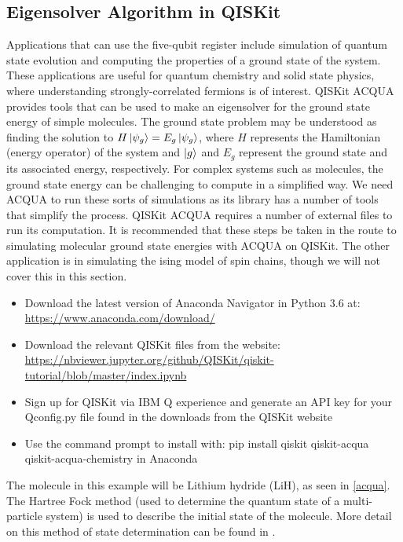 \subsection{Eigensolver Algorithm in QISKit}
Applications that can use the five-qubit register include simulation of quantum state evolution and computing the properties of a ground state of the system. These applications are useful for quantum chemistry and solid state physics, where understanding strongly-correlated fermions is of interest. QISKit ACQUA provides tools that can be used to make an eigensolver for the ground state energy of simple molecules. The ground state problem may be understood as finding the solution to $H\left\vert{\psi_{g}}\right\rangle=E_{g}\left\vert{\psi_{g}}\right\rangle$, where $H$ represents the Hamiltonian (energy operator) of the system and $\left\vert{g}\right\rangle$ and $E_{g}$ represent the ground state and its associated energy, respectively. For complex systems such as molecules, the ground state energy can be challenging to compute in a simplified way. We need ACQUA to run these sorts of simulations as its library has a number of tools that simplify the process.
QISKit ACQUA requires a number of external files to run its computation. It is recommended that these steps be taken in the route to simulating molecular ground state energies with ACQUA on QISKit. The other application is in simulating the ising model of spin chains, though we will not cover this in this section.
\begin{itemize}
    \item Download the latest version of Anaconda Navigator in Python 3.6 at: \url{https://www.anaconda.com/download/}
    \item Download the relevant QISKit files from the website: \url{https://nbviewer.jupyter.org/github/QISKit/qiskit-tutorial/blob/master/index.ipynb}
    \item Sign up for QISKit via IBM Q experience and generate an API key for your Qconfig.py file found in the downloads from the QISKit website 
    \item Use the command prompt to install with: pip install qiskit qiskit-acqua qiskit-acqua-chemistry in Anaconda
\end{itemize}
The molecule in this example will be Lithium hydride (LiH), as seen in \autoref{acqua}. The Hartree Fock method (used to determine the quantum state of a multi-particle system) is used to describe the initial state of the molecule. More detail on this method of state determination can be found in \cite{hartreefockmethod}.  
